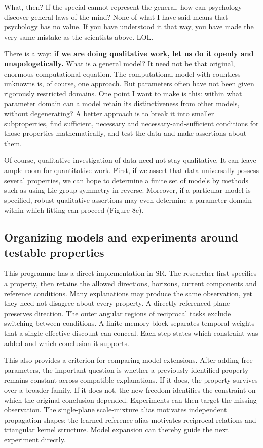 \documentclass[11pt,a4paper]{article}
\begin{document}
What, then? If the special cannot represent the general, how can
psychology discover general laws of the mind? None of what I have said
means that psychology has no value. If you have understood it that way,
you have made the very same mistake as the scientists above. LOL.

There is a way: \textbf{if we are doing qualitative work, let us do it
openly and unapologetically.} What is a general model? It need not be
that original, enormous computational equation. The computational model
with countless unknowns is, of course, one approach. But parameters
often have not been given rigorously restricted domains. One point I
want to make is this: within what parameter domain can a model retain
its distinctiveness from other models, without degenerating? A better
approach is to break it into smaller subproperties, find sufficient,
necessary and necessary-and-sufficient conditions for those properties
mathematically, and test the data and make assertions about them.

Of course, qualitative investigation of data need not stay qualitative.
It can leave ample room for quantitative work. First, if we assert that
data universally possess several properties, we can hope to determine a
finite set of models by methods such as using Lie-group symmetry in
reverse. Moreover, if a particular model is specified, robust
qualitative assertions may even determine a parameter domain within
which fitting can proceed (Figure 8c).

\subsection{Organizing models and experiments around testable
properties}\label{organizing-models-and-experiments-around-testable-properties}

This programme has a direct implementation in SR. The researcher first
specifies a property, then retains the allowed directions, horizons,
current components and reference conditions. Many explanations may
produce the same observation, yet they need not disagree about every
property. A directly referenced plane preserves direction. The outer
angular regions of reciprocal tasks exclude switching between
conditions. A finite-memory block separates temporal weights that a
single effective discount can conceal. Each step states which constraint
was added and which conclusion it supports.

This also provides a criterion for comparing model extensions. After
adding free parameters, the important question is whether a previously
identified property remains constant across compatible explanations. If
it does, the property survives over a broader family. If it does not,
the new freedom identifies the constraint on which the original
conclusion depended. Experiments can then target the missing
observation. The single-plane scale-mixture alias motivates independent
propagation shapes; the learned-reference alias motivates reciprocal
relations and triangular kernel structure. Model expansion can thereby
guide the next experiment directly.
\end{document}

